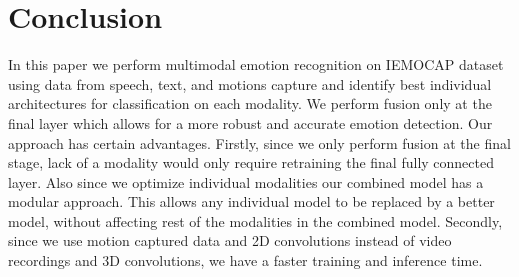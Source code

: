 \documentclass{article}
\begin{document}
\section{Conclusion}
\label{sec:concl}

In this paper we perform multimodal emotion recognition on IEMOCAP dataset using data from speech, text, and motions capture and identify best individual architectures for classification on each modality. We perform fusion only at the final layer which allows for a more robust and accurate emotion detection. Our approach has certain advantages. Firstly, since we only perform fusion at the final stage, lack of a modality would only require retraining the final fully connected layer. Also since we optimize individual modalities our combined model has a modular approach. This allows any individual model to be replaced by a better model, without affecting rest of the modalities in the combined model. Secondly, since we use motion captured data and 2D convolutions instead of video recordings and 3D convolutions, we have a faster training and inference time.




\end{document}
